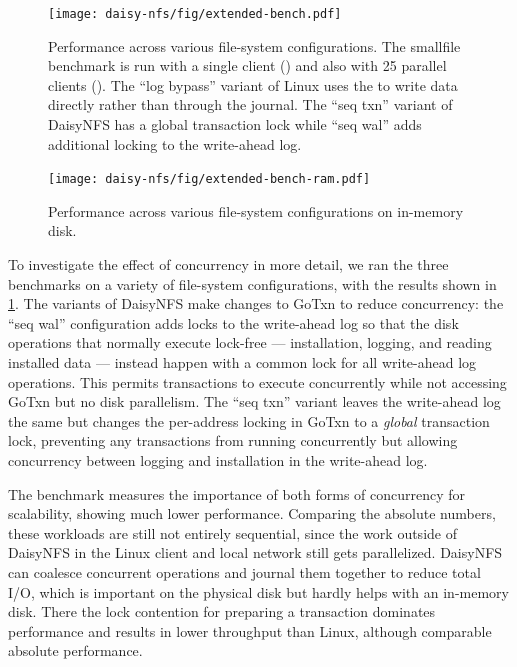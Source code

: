 \begin{figure}[hp]
  \texttt{[image: daisy-nfs/fig/extended-bench.pdf]}
  \caption{Performance across various file-system configurations. The smallfile
    benchmark is run with a single client () and also with 25
    parallel clients (). The ``log bypass'' variant of Linux
    uses the  to write data directly rather than through the
    journal. The ``seq txn'' variant of DaisyNFS has a global transaction lock
    while ``seq wal'' adds additional locking to the write-ahead log.}
  \label{fig:bench-configs}
\end{figure}

\begin{figure}[hp]
  \texttt{[image: daisy-nfs/fig/extended-bench-ram.pdf]}
  \caption{Performance across various file-system configurations on in-memory disk.}
  \label{fig:bench-configs-ram}
\end{figure}


To investigate the effect of concurrency in more detail, we ran the three
benchmarks on a variety of file-system configurations, with the results shown in
\cref{fig:bench-configs}.
The variants of DaisyNFS make changes to GoTxn to reduce concurrency: the
``seq wal'' configuration adds locks to the write-ahead log so that the
disk operations that normally execute lock-free --- installation, logging, and
reading installed data --- instead happen with a common lock for all write-ahead
log operations. This permits transactions to execute concurrently while not
accessing GoTxn but no disk parallelism. The ``seq txn'' variant leaves the
write-ahead log the same but changes the per-address locking in GoTxn to a
\emph{global} transaction lock, preventing any transactions from running
concurrently but allowing concurrency between logging and installation in the
write-ahead log.

The  benchmark measures the importance of both forms of
concurrency for scalability, showing much lower performance. Comparing the
absolute numbers, these workloads are still not entirely sequential, since the
work outside of DaisyNFS in the Linux client and local network still gets
parallelized. DaisyNFS can coalesce concurrent operations and journal them
together to reduce total I/O, which is important on the physical disk but hardly
helps with an in-memory disk. There the lock contention for preparing a
transaction dominates performance and results in lower throughput than Linux,
although comparable absolute performance.

